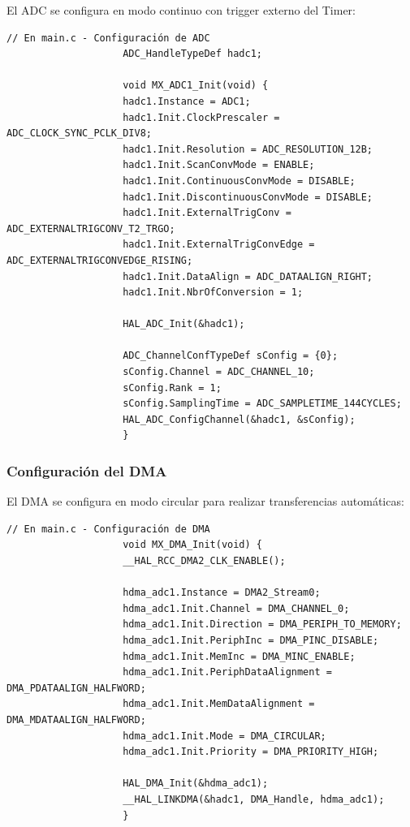 \documentclass[12pt]{article}
\begin{document}
				El ADC se configura en modo continuo con trigger externo del Timer:

				\begin{lstlisting}[style=mystyle, caption=Configuración del ADC]
					// En main.c - Configuración de ADC
					ADC_HandleTypeDef hadc1;

					void MX_ADC1_Init(void) {
					hadc1.Instance = ADC1;
					hadc1.Init.ClockPrescaler = ADC_CLOCK_SYNC_PCLK_DIV8;
					hadc1.Init.Resolution = ADC_RESOLUTION_12B;
					hadc1.Init.ScanConvMode = ENABLE;
					hadc1.Init.ContinuousConvMode = DISABLE;
					hadc1.Init.DiscontinuousConvMode = DISABLE;
					hadc1.Init.ExternalTrigConv = ADC_EXTERNALTRIGCONV_T2_TRGO;
					hadc1.Init.ExternalTrigConvEdge = ADC_EXTERNALTRIGCONVEDGE_RISING;
					hadc1.Init.DataAlign = ADC_DATAALIGN_RIGHT;
					hadc1.Init.NbrOfConversion = 1;
					
					HAL_ADC_Init(&hadc1);
					
					ADC_ChannelConfTypeDef sConfig = {0};
					sConfig.Channel = ADC_CHANNEL_10;
					sConfig.Rank = 1;
					sConfig.SamplingTime = ADC_SAMPLETIME_144CYCLES;
					HAL_ADC_ConfigChannel(&hadc1, &sConfig);
					}
				\end{lstlisting}

			\subsubsection{Configuración del DMA}

				El DMA se configura en modo circular para realizar transferencias automáticas:

				\begin{lstlisting}[style=mystyle, caption=Configuración del DMA]
					// En main.c - Configuración de DMA
					void MX_DMA_Init(void) {
					__HAL_RCC_DMA2_CLK_ENABLE();
					
					hdma_adc1.Instance = DMA2_Stream0;
					hdma_adc1.Init.Channel = DMA_CHANNEL_0;
					hdma_adc1.Init.Direction = DMA_PERIPH_TO_MEMORY;
					hdma_adc1.Init.PeriphInc = DMA_PINC_DISABLE;
					hdma_adc1.Init.MemInc = DMA_MINC_ENABLE;
					hdma_adc1.Init.PeriphDataAlignment = DMA_PDATAALIGN_HALFWORD;
					hdma_adc1.Init.MemDataAlignment = DMA_MDATAALIGN_HALFWORD;
					hdma_adc1.Init.Mode = DMA_CIRCULAR;
					hdma_adc1.Init.Priority = DMA_PRIORITY_HIGH;
					
					HAL_DMA_Init(&hdma_adc1);
					__HAL_LINKDMA(&hadc1, DMA_Handle, hdma_adc1);
					}
				\end{lstlisting}
\end{document}
